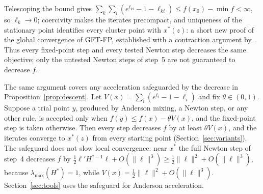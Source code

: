 \documentclass[11pt]{article}
\begin{document}
Telescoping the bound gives
$\sum_{k}\sum_{i}(e^{\ell_{ki}}-1-\ell_{ki})\leq f(x_{0})-\min f
<\infty$, so $\ell_{k}\to0$; coercivity makes the iterates
precompact, and uniqueness of the stationary point identifies every
cluster point with $x^{\ast}(z)$: a short new proof of the global
convergence of GFT-FP, established with a contraction argument by
\citet{ArchakovHansen:Correlation}. Thus every fixed-point step and
every tested Newton step decreases the same objective; only the
untested Newton steps of step~5 are not guaranteed to decrease $f$.

The same argument covers any acceleration safeguarded by the decrease
in Proposition~\ref{prop:descent}. Let
$V(x)=\sum_i(e^{\ell_i}-1-\ell_i)$ and fix $\theta\in(0,1)$. Suppose
a trial point $y$, produced by Anderson mixing, a Newton step, or any
other rule, is accepted only when $f(y)\leq f(x)-\theta V(x)$, and the
fixed-point step is taken otherwise. Then every step decreases $f$ by
at least $\theta V(x)$, and the iterates converge to $x^{\ast}(z)$
from every starting point (Section~\ref{sec:variants}). The safeguard does
not slow local convergence: near $x^{\ast}$ the full Newton step of
step~4 decreases $f$ by
$\tfrac12\ell'H^{\ast-1}\ell+O(\|\ell\|^{3})\geq\tfrac12\|\ell\|^{2}+O(\|\ell\|^{3})$,
because $\lambda_{\max}(H^{\ast})=1$, while
$V(x)=\tfrac12\|\ell\|^{2}+O(\|\ell\|^{3})$.
Section~\ref{sec:tools} uses the safeguard for Anderson acceleration.
\end{document}
